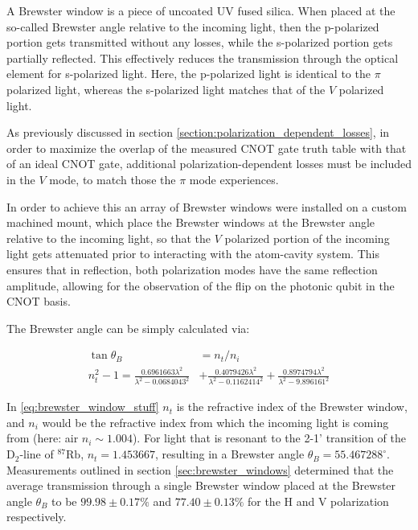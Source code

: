 A Brewster window is a piece of uncoated UV fused silica. When placed at the so-called Brewster angle relative to the incoming light, then the p-polarized portion gets transmitted without any losses, while the s-polarized portion gets partially reflected. This effectively reduces the transmission through the optical element for s-polarized light. Here, the p-polarized light is identical to the $\pi$ polarized light, whereas the s-polarized light matches that of the $V$ polarized light.

As previously discussed in section \ref{section:polarization_dependent_losses}, in order to maximize the overlap of the measured CNOT gate truth table with that of an ideal CNOT gate, additional polarization-dependent losses must be included in the $V$ mode, to match those the $\pi$ mode experiences.

In order to achieve this an array of Brewster windows were installed on a custom machined mount, which place the Brewster windows at the Brewster angle relative to the incoming light, so that the $V$ polarized portion of the incoming light gets attenuated prior to interacting with the atom-cavity system. This ensures that in reflection, both polarization modes have the same reflection amplitude, allowing for the observation of the flip on the photonic qubit in the CNOT basis.

The Brewster angle can be simply calculated via:\cite{ThorlabsBW}

\begin{align}
	\tan{\theta_B}                                                 & = n_t/n_i                                                                                                 \\
	n_t^2 -1 = \frac{0.6961663 \lambda^2}{\lambda^2 - 0.0684043^2} & + \frac{0.4079426 \lambda^2}{\lambda^2 - 0.1162414^2} + \frac{0.8974794\lambda^2}{\lambda^2 - 9.896161^2}
	\label{eq:brewster_window_stuff}
\end{align}

In \eqref{eq:brewster_window_stuff} $n_t$ is the refractive index of the Brewster window, and $n_i$ would be the refractive index from which the incoming light is coming from (here: air $n_i \sim 1.004$). For light that is resonant to the 2-1' transition of the $\text{D}_2$-line of $^{87}\text{Rb}$, $n_t=1.453667$, resulting in a Brewster angle $\theta_B=55.467288^{\circ}$. Measurements outlined in section \ref{sec:brewster_windows} determined that the average transmission through a single Brewster window placed at the Brewster angle $\theta_B$ to be $99.98\pm0.17\%$ and $77.40\pm0.13\%$ for the H and V polarization respectively.

